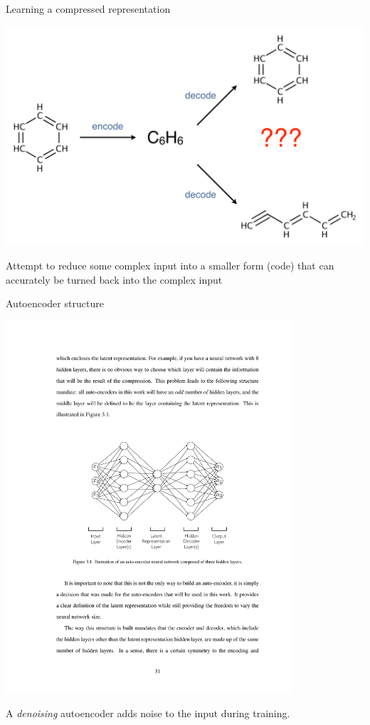 \documentclass[xetex,compress]{beamer}
\begin{document}
\begin{frame}{Learning a compressed representation}
  \begin{center}
    \includegraphics[width=1.00\textwidth]{./figures/autoencoder_example.pdf}
  \end{center}
  Attempt to reduce some complex input into a smaller form (code) that can accurately be turned back into the complex input
\end{frame}

\begin{frame}{Autoencoder structure}
  \begin{center}
    \includegraphics[width=0.80\textwidth]{./figures/autoencoder.pdf}
  \end{center}
  A \textit{denoising} autoencoder adds noise to the input during training.
\end{frame}
\end{document}
